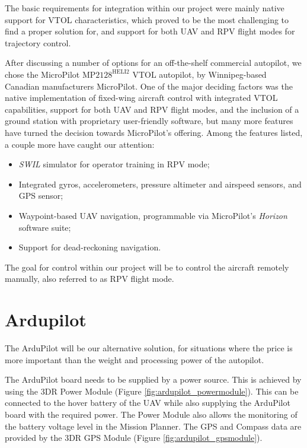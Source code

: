 \documentclass[english,fira]{ist-report}
\newcommand\micropilot{$\text{MP}2128^{\text{HELI}2}$}
\begin{document}
The basic requirements for integration within our project were mainly native support for VTOL characteristics, which proved to be the most challenging to find a proper solution for, and support for both UAV and RPV flight modes for trajectory control. \par
\vspace{0.25cm}
After discussing a number of options for an off-the-shelf commercial autopilot, we chose the MicroPilot \micropilot{} VTOL autopilot, by Winnipeg-based Canadian manufacturers MicroPilot. One of the major deciding factors was the native implementation of fixed-wing aircraft control with integrated VTOL capabilities, support for both UAV and RPV flight modes, and the inclusion of a ground station with proprietary user-friendly software, but many more features have turned the decision towards MicroPilot's offering. Among the features listed, a couple more have caught our attention:
\begin{itemize}
	\item \textit{SWIL}\footnotemark{} simulator for operator training in RPV mode;
	\item Integrated gyros, accelerometers, pressure altimeter and airspeed sensors, and GPS sensor;
	\item Waypoint-based UAV navigation, programmable via MicroPilot's \textit{Horizon} software suite;
	\item Support for dead-reckoning navigation.
\end{itemize}

The goal for control within our project will be to control the aircraft remotely manually, also referred to as RPV flight mode.
\newpage
\section{Ardupilot}

The ArduPilot will be our alternative solution, for situations where the price is more important than the weight and processing power of the autopilot. \par

The ArduPilot board needs to be supplied by a power source. This is achieved by using the 3DR Power Module (Figure \ref{fig:ardupilot_powermodule}). This can be connected to the hover battery of the UAV while also supplying the ArduPilot board with the required power. The Power Module also allows the monitoring of the battery voltage level in the Mission Planner. The GPS and Compass data are provided by the 3DR GPS Module (Figure \ref{fig:ardupilot_gpsmodule}). \par
\end{document}
